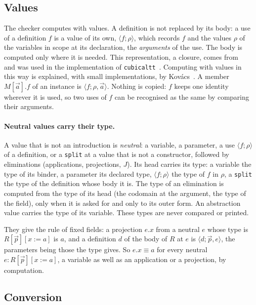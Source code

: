 \documentclass[11pt]{article}
\newcommand{\kw}[1]{\texttt{#1}}
\begin{document}
\subsection{Values}

The checker computes with values. A definition is not replaced by its
body: a use of a definition $f$ is a value of its own,
$\langle f;\rho\rangle$, which records $f$ and the values $\rho$ of the
variables in scope at its declaration, the \emph{arguments} of the use.
The body is computed only where it is needed. This representation, a
closure, comes from~\cite{C96,Wang} and was used in the implementation
of \texttt{cubicaltt}~\cite{cubicaltt}. Computing with values in this way is
explained, with small implementations, by Kov\'acs~\cite{Kov}. A member $M[\vec a].f$ of an
instance is $\langle f;\rho,\vec a\rangle$. Nothing is copied: $f$ keeps
one identity wherever it is used, so two uses of $f$ can be recognised
as the same by comparing their arguments.

\paragraph{Neutral values carry their type.}\label{sec:values} A value
that is not an introduction is \emph{neutral}: a variable, a parameter, a
use $\langle f;\rho\rangle$ of a definition, or a \kw{split} at a value
that is not a constructor, followed by eliminations (applications,
projections, $J$). Its head carries its type: a variable the type of its
binder, a parameter its declared type, $\langle f;\rho\rangle$ the type of
$f$ in $\rho$, a \kw{split} the type of the definition whose body it is.
The type of an elimination is computed from the type of its head (the
codomain at the argument, the type of the field), only when it is asked
for and only to its outer form. An abstraction value carries the type of
its variable. These types are never compared or printed.

They give the rule of fixed fields: a projection $e.x$ from a neutral $e$
whose type is $R[\vec p][x:=a]$ is $a$, and a definition $d$ of the body
of $R$ at $e$ is $\langle d;\vec p,e\rangle$, the parameters being those
the type gives. So $e.x\equiv a$ for every neutral $e : R[\vec p][x:=a]$,
a variable as well as an application or a projection, by computation.

\subsection{Conversion}\label{sec:conv}
\end{document}
